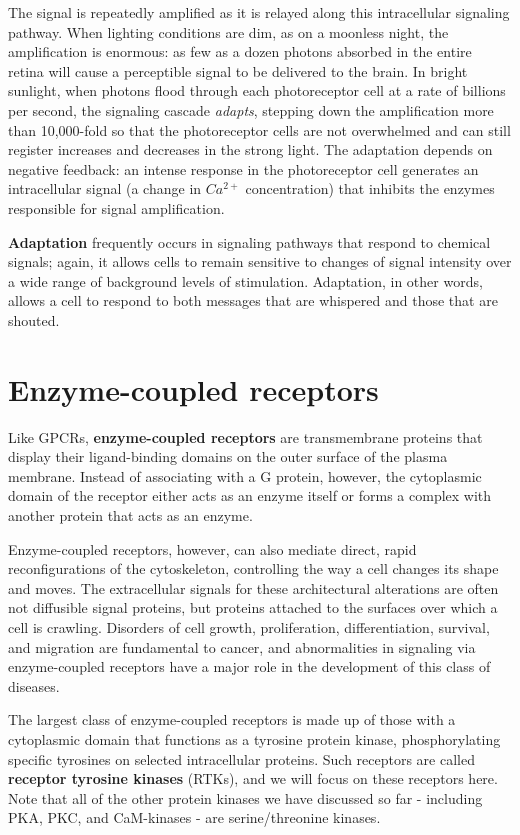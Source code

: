 The signal is repeatedly amplified as it is relayed along this intracellular
signaling pathway. When lighting conditions are dim, as
on a moonless night, the amplification is enormous: as few as a dozen
photons absorbed in the entire retina will cause a perceptible signal to
be delivered to the brain. In bright sunlight, when photons flood through
each photoreceptor cell at a rate of billions per second, the signaling
cascade \textit{adapts}, stepping down the amplification more than 10,000-fold
so that the photoreceptor cells are not overwhelmed and can still register
increases and decreases in the strong light. The adaptation depends on
negative feedback: an intense response in the photoreceptor cell generates
an intracellular signal (a change in $Ca^{2+}$ concentration) that inhibits
the enzymes responsible for signal amplification.

\textbf{Adaptation} frequently occurs in signaling pathways that respond to
chemical signals; again, it allows cells to remain sensitive to changes of
signal intensity over a wide range of background levels of stimulation.
Adaptation, in other words, allows a cell to respond to both messages
that are whispered and those that are shouted.

\section{Enzyme-coupled receptors}

Like GPCRs, \textbf{enzyme-coupled receptors} are transmembrane proteins
that display their ligand-binding domains on the outer surface of the
plasma membrane. Instead of associating with a G protein, however, the
cytoplasmic domain of the receptor either acts as an enzyme itself or
forms a complex with another protein that acts as an enzyme.

Enzyme-coupled receptors, however, can also mediate direct, rapid
reconfigurations of the cytoskeleton, controlling the way a cell changes
its shape and moves. The extracellular signals for these architectural
alterations are often not diffusible signal proteins, but proteins attached
to the surfaces over which a cell is crawling. Disorders of cell growth,
proliferation, differentiation, survival, and migration are fundamental
to cancer, and abnormalities in signaling via enzyme-coupled receptors
have a major role in the development of this class of diseases.

The largest class of enzyme-coupled receptors is made up of those with
a cytoplasmic domain that functions as a tyrosine protein kinase, phosphorylating
specific tyrosines on selected intracellular proteins. Such
receptors are called \textbf{receptor tyrosine kinases} (RTKs), and we will focus
on these receptors here. Note that all of the other protein kinases we
have discussed so far - including PKA, PKC, and CaM-kinases - are serine/threonine kinases.

